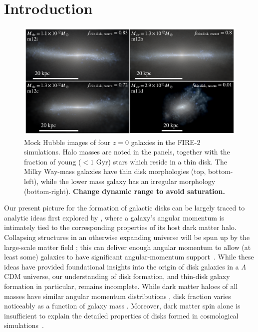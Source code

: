 \documentclass[fleqn,usenatbib]{mnras}
\begin{document}


\section{Introduction}
\label{s: introduction}

\begin{figure}
    \centering
    \includegraphics[width=\textwidth]{figures/stars.pdf}
    \caption{
    Mock Hubble images of four $z=0$ galaxies in the FIRE-2 simulations. Halo masses are noted in the panels, together with the fraction of young ($<1$ Gyr) stars which reside in a thin disk.  The Milky Way-mass galaxies have thin disk morphologies (top, bottom-left), while the lower mass galaxy has an irregular morphology (bottom-right).
    \textbf{Change dynamic range to avoid saturation.}
    }
    \label{f: stars}
\end{figure}

Our present picture for the formation of galactic disks can be largely traced to analytic ideas first explored by \citet{fall1980}, where a galaxy's angular momentum is intimately tied to the corresponding properties of its host dark matter halo.
Collapsing structures in an otherwise expanding universe will be spun up by the large-scale matter field \citep{Peebles69};
this can deliver enough angular momentum to allow (at least some) galaxies to have significant angular-momentum support~\citep[e.g.][]{MMW98}. 
While these ideas have provided foundational insights into the origin of disk galaxies in a $\Lambda$CDM universe, our understanding of disk  formation, and thin-disk galaxy formation in particular, remains incomplete. 
While dark matter haloes of all masses have similar angular momentum distributions \citep[e.g.][]{Barnes87}, disk fraction varies noticeably as a function of galaxy mass \citep[e.g.][]{Bernardi2010, Bluck2014, Moffett16}.
Moreover, dark matter spin alone is insufficient to explain the detailed properties of disks formed in cosmological simulations~\citep[e.g.][]{Sales2012, GK18}.  
\end{document}
